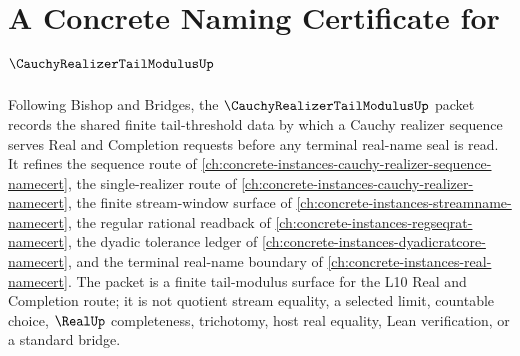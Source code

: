 \chapter{A Concrete Naming Certificate for $\CauchyRealizerTailModulusUp$}
\label{ch:concrete-instances-cauchy-realizer-tail-modulus-namecert}

Following Bishop and Bridges, the $\CauchyRealizerTailModulusUp$ packet records the shared finite tail-threshold data by which a Cauchy realizer sequence serves Real and Completion requests before any terminal real-name seal is read. It refines the sequence route of \autoref{ch:concrete-instances-cauchy-realizer-sequence-namecert}, the single-realizer route of \autoref{ch:concrete-instances-cauchy-realizer-namecert}, the finite stream-window surface of \autoref{ch:concrete-instances-streamname-namecert}, the regular rational readback of \autoref{ch:concrete-instances-regseqrat-namecert}, the dyadic tolerance ledger of \autoref{ch:concrete-instances-dyadicratcore-namecert}, and the terminal real-name boundary of \autoref{ch:concrete-instances-real-namecert}. The packet is a finite tail-modulus surface for the L10 Real and Completion route; it is not quotient stream equality, a selected limit, countable choice, $\RealUp$ completeness, trichotomy, host real equality, Lean verification, or a standard bridge.

